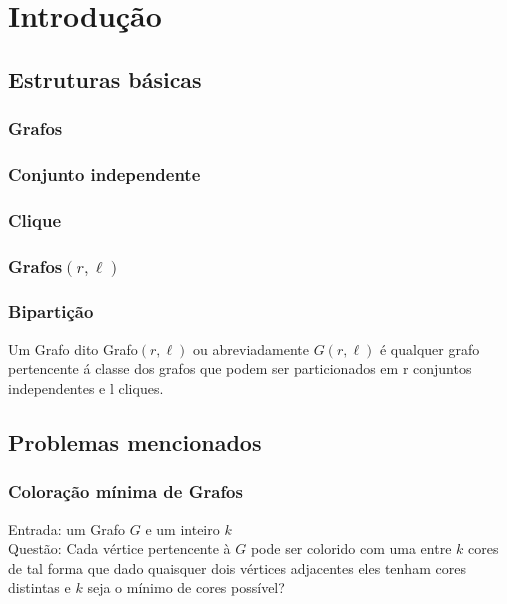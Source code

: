 \chapter{Introdução} \label{cap:intro}

\section{Estruturas básicas}

\subsection{Grafos}
\subsection{Conjunto independente}
\subsection{Clique}
\subsection{Grafos$(r,\ell)$}
\subsection{Bipartição}
\begin{definition}
	Um Grafo dito Grafo$(r,\ell)$ ou abreviadamente $G(r,\ell)$ é qualquer grafo pertencente á classe dos grafos que podem ser particionados em r conjuntos independentes e l cliques.
\end{definition}

\section{Problemas mencionados}

\subsection{Coloração mínima de Grafos}
\begin{definition}
	Entrada: um Grafo $G$ e um inteiro $k$\\
	Questão: Cada vértice pertencente à $G$ pode ser colorido com uma entre $k$ cores
	de tal forma que dado quaisquer dois vértices adjacentes eles tenham cores distintas e $k$ seja o mínimo de cores possível?
\end{definition}

